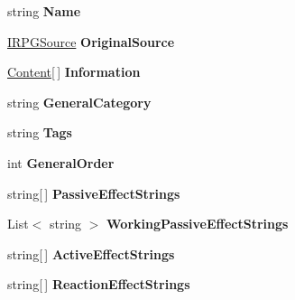 \begin{DoxyCompactItemize}
\item 
\hypertarget{class_t_effect_ae2e16fed884be48995efaa34fe1de953}{}string {\bfseries Name}\label{class_t_effect_ae2e16fed884be48995efaa34fe1de953}

\item 
\hypertarget{class_t_effect_af4c05ccaf01ff60830476692e664ed46}{}\hyperlink{interface_i_r_p_g_source}{I\+R\+P\+G\+Source} {\bfseries Original\+Source}\label{class_t_effect_af4c05ccaf01ff60830476692e664ed46}

\item 
\hypertarget{class_t_effect_a055eecd64b18735565edfca0038d2a63}{}\hyperlink{struct_content}{Content}\mbox{[}$\,$\mbox{]} {\bfseries Information}\label{class_t_effect_a055eecd64b18735565edfca0038d2a63}

\item 
\hypertarget{class_t_effect_a8d72bc042c7aa936103d7d9a1b73dbdd}{}string {\bfseries General\+Category}\label{class_t_effect_a8d72bc042c7aa936103d7d9a1b73dbdd}

\item 
\hypertarget{class_t_effect_a4e87f7bde97b87ab4d6b752188448d91}{}string {\bfseries Tags}\label{class_t_effect_a4e87f7bde97b87ab4d6b752188448d91}

\item 
\hypertarget{class_t_effect_a20680745c6f644fa9eef2437d68fa08f}{}int {\bfseries General\+Order}\label{class_t_effect_a20680745c6f644fa9eef2437d68fa08f}

\item 
\hypertarget{class_t_effect_adc77902a018f410d4dfeb4876e46d9b2}{}string\mbox{[}$\,$\mbox{]} {\bfseries Passive\+Effect\+Strings}\label{class_t_effect_adc77902a018f410d4dfeb4876e46d9b2}

\item 
\hypertarget{class_t_effect_a247fa858e50f50d3fc366e0b722ed7a0}{}List$<$ string $>$ {\bfseries Working\+Passive\+Effect\+Strings}\label{class_t_effect_a247fa858e50f50d3fc366e0b722ed7a0}

\item 
\hypertarget{class_t_effect_aadda58a14ce7f7c5565a6e35d1297ab9}{}string\mbox{[}$\,$\mbox{]} {\bfseries Active\+Effect\+Strings}\label{class_t_effect_aadda58a14ce7f7c5565a6e35d1297ab9}

\item 
\hypertarget{class_t_effect_ad829ee82d6cafadeb4c64ac6b089af87}{}string\mbox{[}$\,$\mbox{]} {\bfseries Reaction\+Effect\+Strings}\label{class_t_effect_ad829ee82d6cafadeb4c64ac6b089af87}


\end{DoxyCompactItemize}
